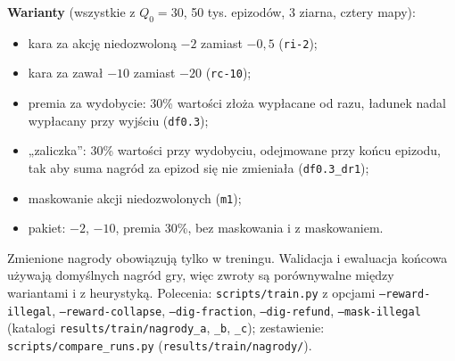 \documentclass[11pt,a4paper]{article}
\begin{document}
\textbf{Warianty} (wszystkie z $Q_0=30$, 50 tys. epizodów, 3 ziarna, cztery mapy):
\begin{itemize}
  \item kara za akcję niedozwoloną $-2$ zamiast $-0{,}5$ (\texttt{ri-2});
  \item kara za zawał $-10$ zamiast $-20$ (\texttt{rc-10});
  \item premia za wydobycie: 30\% wartości złoża wypłacane od razu, ładunek nadal
  wypłacany przy wyjściu (\texttt{df0.3});
  \item „zaliczka”: 30\% wartości przy wydobyciu, odejmowane przy końcu epizodu, tak
  aby suma nagród za epizod się nie zmieniała (\texttt{df0.3\_dr1});
  \item maskowanie akcji niedozwolonych (\texttt{m1});
  \item pakiet: $-2$, $-10$, premia 30\%, bez maskowania i z maskowaniem.
\end{itemize}
Zmienione nagrody obowiązują tylko w treningu. Walidacja i ewaluacja końcowa używają
domyślnych nagród gry, więc zwroty są porównywalne między wariantami i z heurystyką.
Polecenia: \texttt{scripts/train.py} z opcjami \texttt{--reward-illegal},
\texttt{--reward-collapse}, \texttt{--dig-fraction}, \texttt{--dig-refund},
\texttt{--mask-illegal} (katalogi \texttt{results/train/nagrody\_a}, \texttt{\_b},
\texttt{\_c}); zestawienie: \texttt{scripts/compare\_runs.py}
(\texttt{results/train/nagrody/}).
\end{document}

